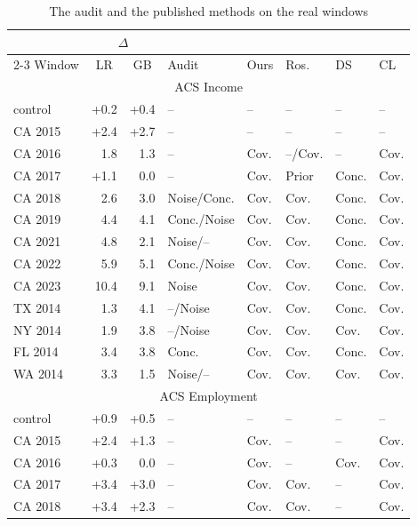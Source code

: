 \documentclass[pdflatex,sn-basic]{sn-jnl}
\begin{document}
\begin{table}[!htbp]\centering\tablebodyfont
\caption{The audit and the published methods on the real windows}\label{tab:realaudits}%
\begin{tabular}{@{}lrrlllll@{}}
\toprule
 & \multicolumn{2}{c}{$\Delta$} &  &  &  &  &  \\
\cmidrule(lr){2-3}
Window & \multicolumn{1}{c}{LR} & \multicolumn{1}{c}{GB} & Audit & Ours & Ros. & DS & CL \\
\midrule
\multicolumn{8}{c}{ACS Income} \\
control & +0.2 & +0.4 & -- & -- & -- & -- & -- \\
CA 2015 & +2.4 & +2.7 & -- & -- & -- & -- & -- \\
CA 2016 & \textminus{}1.8 & \textminus{}1.3 & -- & Cov. & --/Cov. & -- & Cov. \\
CA 2017 & +1.1 & 0.0 & -- & Cov. & Prior & Conc. & Cov. \\
CA 2018 & \textminus{}2.6 & \textminus{}3.0 & Noise/Conc. & Cov. & Cov. & Conc. & Cov. \\
CA 2019 & \textminus{}4.4 & \textminus{}4.1 & Conc./Noise & Cov. & Cov. & Conc. & Cov. \\
CA 2021 & \textminus{}4.8 & \textminus{}2.1 & Noise/-- & Cov. & Cov. & Conc. & Cov. \\
CA 2022 & \textminus{}5.9 & \textminus{}5.1 & Conc./Noise & Cov. & Cov. & Conc. & Cov. \\
CA 2023 & \textminus{}10.4 & \textminus{}9.1 & Noise & Cov. & Cov. & Conc. & Cov. \\
TX 2014 & \textminus{}1.3 & \textminus{}4.1 & --/Noise & Cov. & Cov. & Conc. & Cov. \\
NY 2014 & \textminus{}1.9 & \textminus{}3.8 & --/Noise & Cov. & Cov. & Cov. & Cov. \\
FL 2014 & \textminus{}3.4 & \textminus{}3.8 & Conc. & Cov. & Cov. & Conc. & Cov. \\
WA 2014 & \textminus{}3.3 & \textminus{}1.5 & Noise/-- & Cov. & Cov. & Cov. & Cov. \\
\midrule
\multicolumn{8}{c}{ACS Employment} \\
control & +0.9 & +0.5 & -- & -- & -- & -- & -- \\
CA 2015 & +2.4 & +1.3 & -- & Cov. & -- & -- & Cov. \\
CA 2016 & +0.3 & 0.0 & -- & Cov. & -- & Cov. & Cov. \\
CA 2017 & +3.4 & +3.0 & -- & Cov. & Cov. & -- & Cov. \\
CA 2018 & +3.4 & +2.3 & -- & Cov. & Cov. & -- & Cov. \\

\end{tabular}
\end{table}
\end{document}
